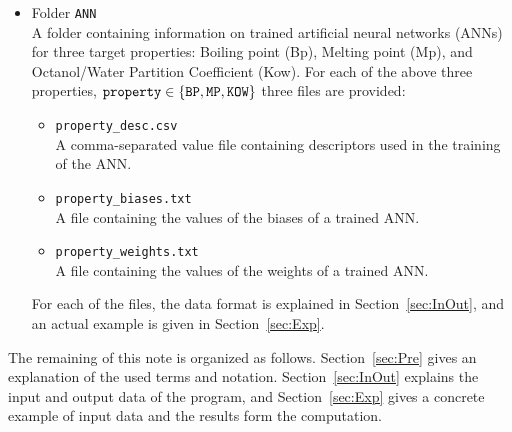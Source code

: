 \documentclass[11pt,titlepage,dvipdfmx,twoside]{book}
\begin{document}
\begin{itemize}
\begin{itemize}
\item Folder {\tt ANN}\\
A folder containing information on trained artificial neural networks (ANNs) for three target properties:
Boiling point (Bp), Melting point (Mp), and Octanol/Water Partition Coefficient (Kow).
For each of the above three properties, ${\tt property} \in \{{\tt BP, MP, KOW}\}$ three files are provided:
%
\begin{itemize}
\item {\tt property\_desc.csv}\\
A comma-separated value file containing descriptors
used in the training of the ANN.

\item {\tt property\_biases.txt}\\
A file containing the values of the biases of a trained ANN.

\item {\tt property\_weights.txt}\\
A file containing the values of the weights of a trained ANN.
\end{itemize}
%
For each of the files, the data format is explained in Section~\ref{sec:InOut},
and an actual example is given in Section~\ref{sec:Exp}.

% 
%
\end{itemize}
\end{itemize}



The remaining of this note is organized as follows.
Section~\ref{sec:Pre} gives an explanation 
of the used terms and notation.
%
Section~\ref{sec:InOut} explains the 
input and output data of the program,
and Section~\ref{sec:Exp} gives a concrete
example of input data and the results form the computation.
\end{document}
